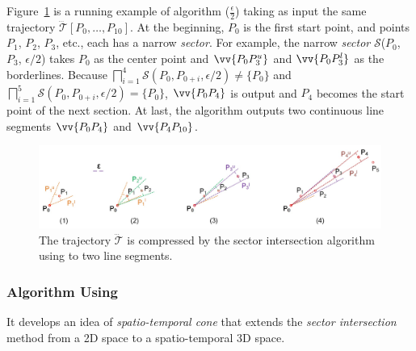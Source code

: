 \begin{example}
	\label{exm-alg-sleeve}
	Figure~\ref{fig:sleeve} is a running example of algorithm \siped($\frac{\epsilon}{2}$) taking as input the same trajectory $\dddot{\mathcal{T}}[P_0, \ldots, P_{10}]$. At the beginning, $P_0$ is the first start point, and points $P_1$, $P_2$, $P_3$, etc., each has a narrow \emph{sector}.
	For example, the narrow \emph{sector} $\mathcal{S}$($P_0$, $P_{3}$, $\epsilon/2$) takes $P_0$ as the center point and $\vv{P_0P^u_{3}}$ and $\vv{P_0P^l_{3}}$ as the borderlines.
	Because $\bigsqcap_{i=1}^{4}\mathcal{S}(P_0, P_{0+i}, \epsilon/2) \ne \{P_0\}$ and $\bigsqcap_{i=1}^{5}\mathcal{S}(P_0, P_{0+i}, \epsilon/2) = \{P_0\}$, $\vv{P_0P_4}$ is output and $P_4$ becomes the start point of the next section.
	At last, the algorithm outputs two continuous line segments $\vv{P_0P_4}$ and $\vv{P_4P_{10}}$.
\end{example}

\begin{figure}[tb!]
	\centering
	\includegraphics[scale=0.66]{Figures/Fig-sleeve.jpg}
	\vspace{-2ex}
	\caption{\small The trajectory $\dddot{\mathcal{T}}$ is compressed by the sector intersection algorithm using \ped to two line segments.}
	\vspace{-1ex}
	\label{fig:sleeve}
\end{figure}




\subsubsection{Algorithm \cised Using \sed \cite{Lin:Cised}}
It develops an idea of \textit{spatio-temporal cone} that extends the \textit{sector intersection} method \cite{Williams:Longest, Sklansky:Cone, Dunham:Cone, Zhao:Sleeve} from a 2D space to a spatio-temporal 3D space.

